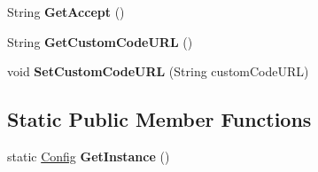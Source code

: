 \begin{DoxyCompactItemize}
\item 
\hypertarget{classcom_1_1shephertz_1_1app42_1_1paas_1_1sdk_1_1windows_1_1_config_a064783dc88748ec0a9d1e9427ec3b351}{String {\bfseries Get\+Accept} ()}\label{classcom_1_1shephertz_1_1app42_1_1paas_1_1sdk_1_1windows_1_1_config_a064783dc88748ec0a9d1e9427ec3b351}

\item 
\hypertarget{classcom_1_1shephertz_1_1app42_1_1paas_1_1sdk_1_1windows_1_1_config_ad2bbe2173349319fcc96d712e2a0e544}{String {\bfseries Get\+Custom\+Code\+U\+R\+L} ()}\label{classcom_1_1shephertz_1_1app42_1_1paas_1_1sdk_1_1windows_1_1_config_ad2bbe2173349319fcc96d712e2a0e544}

\item 
\hypertarget{classcom_1_1shephertz_1_1app42_1_1paas_1_1sdk_1_1windows_1_1_config_a05023691e9fc43359dc2a9c88b3f18a6}{void {\bfseries Set\+Custom\+Code\+U\+R\+L} (String custom\+Code\+U\+R\+L)}\label{classcom_1_1shephertz_1_1app42_1_1paas_1_1sdk_1_1windows_1_1_config_a05023691e9fc43359dc2a9c88b3f18a6}

\end{DoxyCompactItemize}
\subsection*{Static Public Member Functions}
\begin{DoxyCompactItemize}
\item 
\hypertarget{classcom_1_1shephertz_1_1app42_1_1paas_1_1sdk_1_1windows_1_1_config_a34718dec2c325eb880dab61bbb7f616e}{static \hyperlink{classcom_1_1shephertz_1_1app42_1_1paas_1_1sdk_1_1windows_1_1_config}{Config} {\bfseries Get\+Instance} ()}\label{classcom_1_1shephertz_1_1app42_1_1paas_1_1sdk_1_1windows_1_1_config_a34718dec2c325eb880dab61bbb7f616e}

\end{DoxyCompactItemize}
